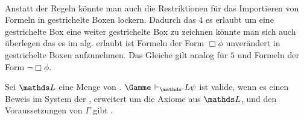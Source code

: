 
\\
Anstatt der Regeln könnte man auch die Restriktionen für das Importieren von Formeln in gestrichelte Boxen lockern.
Dadurch das $4$ es erlaubt um eine gestrichelte Box eine weiter gestrichelte Box zu zeichnen könnte man sich auch überlegen das es im alg. erlaubt ist Formeln der Form $\Box \phi$ unverändert in gestrichelte Boxen aufzunehmen.
Das Gleiche gilt analog für $5$ und Formeln der Form $\neg \Box \phi$.

\begin{definition}
	Sei $\Menge{L}$ eine Menge von \formelSchemata. 
	$\Gamme \Vdash_\Menge{L} \psi$ ist valide, wenn es einen Beweis im \ND System der \NML, erweitert um die Axiome aus $\Menge{L}$, und den Voraussetzungen von $\Gamma$ gibt \cite[S.330]{huth2004logic}.
\end{definition}





